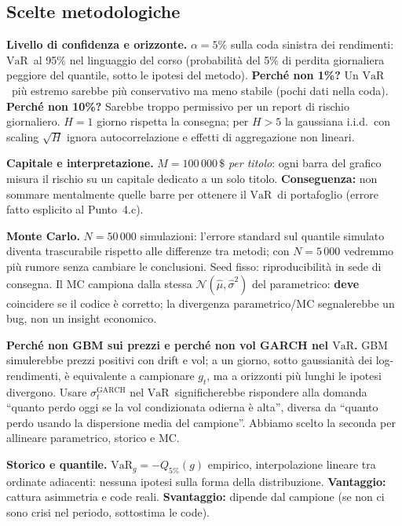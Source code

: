 \documentclass[12pt,a4paper]{article}
\newcommand{\VaR}{\ensuremath{\mathrm{VaR}}}
\newcommand{\USD}{\ensuremath{\,\$}}
\begin{document}
\subsection*{Scelte metodologiche}

\textbf{Livello di confidenza e orizzonte.} $\alpha=5\%$ sulla coda sinistra dei rendimenti: \VaR\ al 95\% nel linguaggio del corso (probabilità del 5\% di perdita giornaliera peggiore del quantile, sotto le ipotesi del metodo). \textbf{Perché non 1\%?} Un \VaR\ più estremo sarebbe più conservativo ma meno stabile (pochi dati nella coda). \textbf{Perché non 10\%?} Sarebbe troppo permissivo per un report di rischio giornaliero. $H=1$ giorno rispetta la consegna; per $H>5$ la gaussiana i.i.d.\ con scaling $\sqrt{H}$ ignora autocorrelazione e effetti di aggregazione non lineari.

\textbf{Capitale e interpretazione.} $M=100\,000\USD$ \emph{per titolo}: ogni barra del grafico misura il rischio su un capitale dedicato a un solo titolo. \textbf{Conseguenza:} non sommare mentalmente quelle barre per ottenere il \VaR\ di portafoglio (errore fatto esplicito al Punto~4.c).

\textbf{Monte Carlo.} $N=50\,000$ simulazioni: l'errore standard sul quantile simulato diventa trascurabile rispetto alle differenze tra metodi; con $N=5\,000$ vedremmo più rumore senza cambiare le conclusioni. Seed fisso: riproducibilità in sede di consegna. Il MC campiona dalla stessa $\mathcal{N}(\hat\mu,\hat\sigma^2)$ del parametrico: \textbf{deve} coincidere se il codice è corretto; la divergenza parametrico/MC segnalerebbe un bug, non un insight economico.

\textbf{Perché non GBM sui prezzi e perché non vol GARCH nel \VaR.} GBM simulerebbe prezzi positivi con drift e vol; a un giorno, sotto gaussianità dei log-rendimenti, è equivalente a campionare $g_t$, ma a orizzonti più lunghi le ipotesi divergono. Usare $\sigma_t^{\mathrm{GARCH}}$ nel \VaR\ significherebbe rispondere alla domanda ``quanto perdo oggi se la vol condizionata odierna è alta'', diversa da ``quanto perdo usando la dispersione media del campione''. Abbiamo scelto la seconda per allineare parametrico, storico e MC.

\textbf{Storico e quantile.} $\VaR_g=-Q_{5\%}(g)$ empirico, interpolazione lineare tra ordinate adiacenti: nessuna ipotesi sulla forma della distribuzione. \textbf{Vantaggio:} cattura asimmetria e code reali. \textbf{Svantaggio:} dipende dal campione (se non ci sono crisi nel periodo, sottostima le code).
\end{document}

